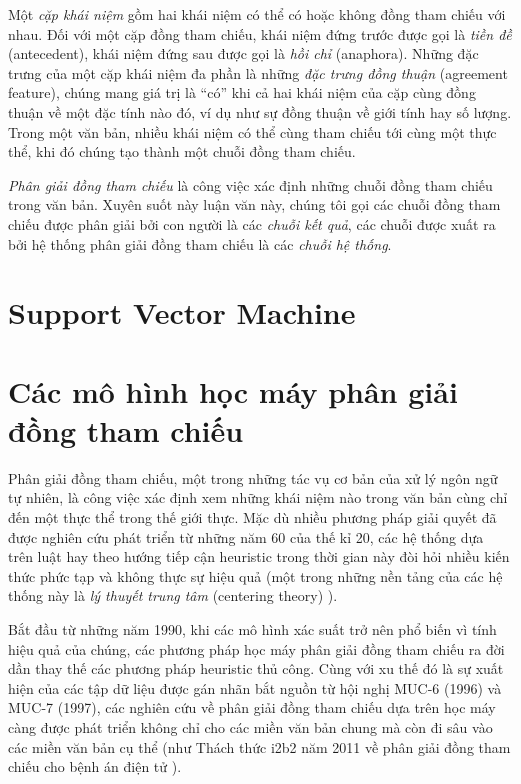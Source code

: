 Một \emph{cặp khái niệm} gồm hai khái niệm có thể có hoặc không đồng tham chiếu với nhau. Đối với một cặp đồng tham chiếu, khái niệm đứng trước được gọi là \emph{tiền đề} (antecedent), khái niệm đứng sau được gọi là \emph{hồi chỉ} (anaphora). Những đặc trưng của một cặp khái niệm đa phần là những \emph{đặc trưng đồng thuận} (agreement feature), chúng mang giá trị là ``có'' khi cả hai khái niệm của cặp cùng đồng thuận về một đặc tính nào đó, ví dụ như sự đồng thuận về giới tính hay số lượng. Trong một văn bản, nhiều khái niệm có thể cùng tham chiếu tới cùng một thực thể, khi đó chúng tạo thành một chuỗi đồng tham chiếu.

\emph{Phân giải đồng tham chiếu} là công việc xác định những chuỗi đồng tham chiếu trong văn bản. Xuyên suốt này luận văn này, chúng tôi gọi các chuỗi đồng tham chiếu được phân giải bởi con người là các \emph{chuỗi kết quả}, các chuỗi được xuất ra bởi hệ thống phân giải đồng tham chiếu là các \emph{chuỗi hệ thống}.

\section{Support Vector Machine}
\section{Các mô hình học máy phân giải đồng tham chiếu}
Phân giải đồng tham chiếu, một trong những tác vụ cơ bản của xử lý ngôn ngữ tự nhiên, là công việc xác định xem những khái niệm nào trong văn bản cùng chỉ đến một thực thể trong thế giới thực. Mặc dù nhiều phương pháp giải quyết đã được nghiên cứu phát triển từ những năm 60 của thế kỉ 20, các hệ thống dựa trên luật hay theo hướng tiếp cận heuristic trong thời gian này đòi hỏi nhiều kiến thức phức tạp và không thực sự hiệu quả (một trong những nền tảng của các hệ thống này là \emph{lý thuyết trung tâm} (centering theory) \cite{Grosz1983}).

Bắt đầu từ những năm 1990, khi các mô hình xác suất trở nên phổ biến vì tính hiệu quả của chúng, các phương pháp học máy phân giải đồng tham chiếu ra đời dần thay thế các phương pháp heuristic thủ công. Cùng với xu thế đó là sự xuất hiện của các tập dữ liệu được gán nhãn bắt nguồn từ hội nghị MUC-6 (1996) và MUC-7 (1997), các nghiên cứu về phân giải đồng tham chiếu dựa trên học máy càng được phát triển không chỉ cho các miền văn bản chung mà còn đi sâu vào các miền văn bản cụ thể (như Thách thức i2b2 năm 2011 về phân giải đồng tham chiếu cho bệnh án điện tử \cite{OzlemUzuner2012}).

